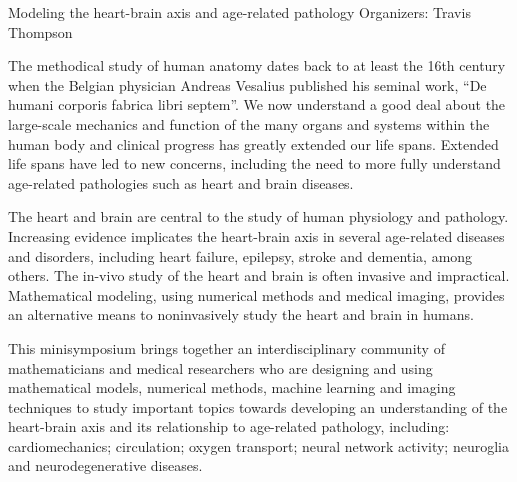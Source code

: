 \label{mini19}

\miniabs
{Modeling the heart-brain axis and age-related pathology}
{Organizers: Travis Thompson}
{The methodical study of human anatomy dates back to at least the 16th century when the Belgian physician Andreas Vesalius published his seminal work, ``De humani corporis fabrica libri septem''.  We now understand a good deal about the large-scale mechanics and function of the many organs and systems within the human body and clinical progress has greatly extended our life spans.  Extended life spans have led to new concerns, including the need to more fully understand age-related pathologies such as heart and brain diseases.

The heart and brain are central to the study of human physiology and pathology.  Increasing evidence implicates the heart-brain axis in several age-related diseases and disorders, including heart failure, epilepsy, stroke and dementia, among others.  The in-vivo study of the heart and brain is often invasive and impractical.  Mathematical modeling, using numerical methods and medical imaging, provides an alternative means to noninvasively study the heart and brain in humans.

This minisymposium brings together an interdisciplinary community of mathematicians and medical researchers who are designing and using mathematical models, numerical methods, machine learning and imaging techniques to study important topics towards developing an understanding of the heart-brain axis and its relationship to age-related pathology, including: cardiomechanics; circulation; oxygen transport; neural network activity; neuroglia and neurodegenerative diseases.}


